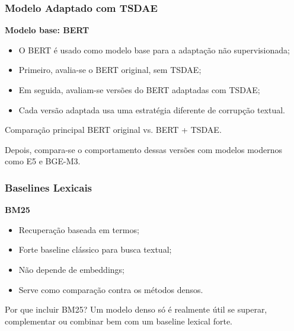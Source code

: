 \documentclass[aspectratio=169]{beamer}
\begin{document}
\begin{frame}
\frametitle{Modelo Adaptado com TSDAE}

\textbf{Modelo base: BERT}

\vspace{0.25cm}

\begin{itemize}
  \item O BERT é usado como modelo base para a adaptação não supervisionada;
  \item Primeiro, avalia-se o BERT original, sem TSDAE;
  \item Em seguida, avaliam-se versões do BERT adaptadas com TSDAE;
  \item Cada versão adaptada usa uma estratégia diferente de corrupção textual.
\end{itemize}

\vspace{0.3cm}

\begin{block}{Comparação principal}
BERT original vs. BERT + TSDAE.

\vspace{0.15cm}

Depois, compara-se o comportamento dessas versões com modelos modernos como E5 e BGE-M3.
\end{block}

\end{frame}

\begin{frame}
\frametitle{Baselines Lexicais}

\textbf{BM25}

\vspace{0.2cm}

\begin{itemize}
  \item Recuperação baseada em termos;
  \item Forte baseline clássico para busca textual;
  \item Não depende de embeddings;
  \item Serve como comparação contra os métodos densos.
\end{itemize}

\vspace{0.3cm}

\begin{block}{Por que incluir BM25?}
Um modelo denso só é realmente útil se superar, complementar ou combinar bem com um baseline lexical forte.
\end{block}

\end{frame}
\end{document}

